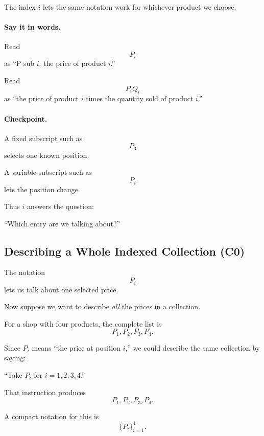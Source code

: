 	The index $i$ lets the same notation work for whichever product we choose.
	
	\paragraph{Say it in words.}
	
	Read
	\[
	P_i
	\]
	as ``P sub $i$: the price of product $i$.''
	
	Read
	\[
	P_iQ_i
	\]
	as ``the price of product $i$ times the quantity sold of product $i$.''
	
	\paragraph{Checkpoint.}
	
	A fixed subscript such as
	\[
	P_3
	\]
	selects one known position.
	
	A variable subscript such as
	\[
	P_i
	\]
	lets the position change.
	
	Thus $i$ answers the question:
	
	\begin{center}
		``Which entry are we talking about?''
	\end{center}
	
	
	\subsection{Describing a Whole Indexed Collection (C0)}
	\label{sec:indexed-collection-c0}
	
	The notation
	\[
	P_i
	\]
	lets us talk about one selected price.
	
	Now suppose we want to describe \emph{all} the prices in a collection.
	
	For a shop with four products, the complete list is
	\[
	P_1,P_2,P_3,P_4.
	\]
	
	Since $P_i$ means ``the price at position $i$,'' we could describe the same collection by saying:
	
	\begin{center}
		``Take $P_i$ for $i=1,2,3,4$.''
	\end{center}
	
	That instruction produces
	\[
	P_1,P_2,P_3,P_4.
	\]
	
	A compact notation for this is
	\[
	\{P_i\}_{i=1}^{4}.
	\]
	
